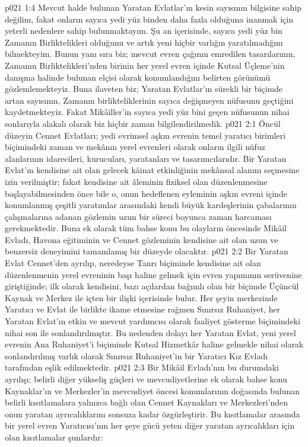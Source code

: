 \vs p021 1:4 Mevcut halde bulunan Yaratan Evlatlar’ın kesin sayısının bilgisine sahip değilim, fakat onların sayıca yedi yüz binden daha fazla olduğuna inanmak için yeterli nedenlere sahip bulunmaktayım. Şu an içerisinde, sayıca yedi yüz bin Zamanın Birliktelikleri olduğunu ve artık yeni hiçbir varlığın yaratılmadığını bilmekteyim. Bunun yanı sıra biz; mevcut evren çağının emredilen tasarılarının, Zamanın Birliktelikleri’nden birinin her yerel evren içinde Kutsal Üçleme’nin danışma halinde bulunan elçisi olarak konumlandığını belirten görünümü gözlemlemekteyiz. Buna ilaveten biz; Yaratan Evlatlar’ın sürekli bir biçimde artan sayısının, Zamanın birlikteliklerinin sayıca değişmeyen nüfusunu geçtiğini kaydetmekteyiz. Fakat Mikâiller’in sayıca yedi yüz bini geçen nüfusunun nihai sonlarıyla alakalı olarak biz hiçbir zaman bilgilendirilmedik.
\vs p021 2:1 Öncül düzeyin Cennet Evlatları; yedi evrimsel aşkın evrenin temel yaratıcı birimleri biçimindeki zaman ve mekânın yerel evrenleri olarak onların ilgili nüfuz alanlarının idarecileri, kurucuları, yaratanları ve tasarımcılarıdır. Bir Yaratan Evlat’ın kendisine ait olan gelecek kâinat etkinliğinin mekânsal alanını seçmesine izin verilmiştir; fakat kendisine ait âleminin fiziksel olan düzenlenmesine başlayabilmesinden önce bile o, onun hedeflenen eyleminin aşkın evreni içinde konumlanmış çeşitli yaratımlar arasındaki kendi büyük kardeşlerinin çabalarının çalışmalarına adanan gözlemin uzun bir süreci boyunca zaman harcaması gerekmektedir. Buna ek olarak tüm bahse konu bu olayların öncesinde Mikâil Evladı, Havona eğitiminin ve Cennet gözleminin kendisine ait olan uzun ve benzersiz deneyimini tamamlamış bir düzeyde olacaktır.
\vs p021 2:2 Bir Yaratan Evlat Cennet’den ayrılıp, neredeyse Tanrı biçiminde kendisine ait olan düzenlenmenin yerel evreninin başı haline gelmek için evren yapımının serüvenine giriştiğinde; ilk olarak kendisini, bazı açılardan bağımlı olan bir biçimde Üçüncül Kaynak ve Merkez ile içten bir ilişki içerisinde bulur. Her şeyin merkezinde Yaratıcı ve Evlat ile birlikte ikame etmesine rağmen Sınırsız Ruhaniyet, her Yaratan Evlat’ın etkin ve mevcut yardımcısı olarak faaliyet gösterme biçimindeki nihai son ile sonlandırılmıştır. Bu nedenden dolayı her Yaratan Evlat, yeni yerel evrenin Ana Ruhaniyet’i biçiminde Kutsal Hizmetkâr haline gelmekle nihai olarak sonlandırılmış varlık olarak Sınırsız Ruhaniyet’in bir Yaratıcı Kız Evladı tarafından eşlik edilmektedir.
\vs p021 2:3 Bir Mikâil Evladı’nın bu durumdaki ayrılışı; belirli diğer yükseliş güçleri ve mevcudiyetlerine ek olarak bahse konu Kaynaklar’ın ve Merkezler’in mevcudiyet öncesi konumlarının doğasında bulunan belirli kısıtlamalara yalnızca bağlı olan Cennet Kaynakları ve Merkezleri’nden onun yaratan ayrıcalıklarını sonsuza kadar özgürleştirir. Bu kısıtlamalar arasında bir yerel evren Yaratıcısı’nın her şeye gücü yeten diğer yaratan ayrıcalıkları için olan kısıtlamalar şunlardır:
